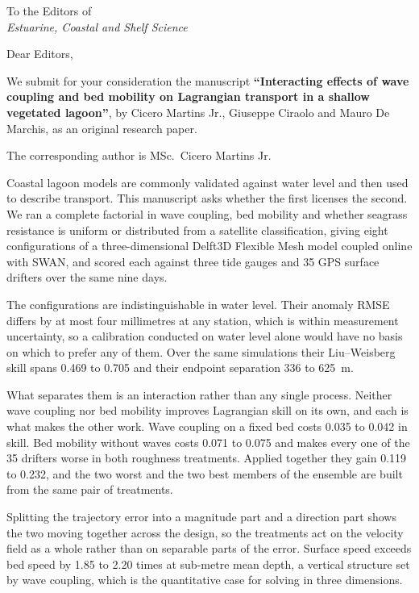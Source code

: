 \documentclass[11pt]{article}
\begin{document}
\thispagestyle{fancy}

\vspace{0.3cm}
\begin{flushright}
To the Editors of\\
\textit{Estuarine, Coastal and Shelf Science}
\end{flushright}

\vspace{0.5cm}
Dear Editors,

\vspace{0.2cm}
We submit for your consideration the manuscript \textbf{``Interacting effects of
wave coupling and bed mobility on Lagrangian transport in a shallow vegetated
lagoon''}, by Cicero Martins Jr., Giuseppe Ciraolo and Mauro De Marchis, as an
original research paper.

The corresponding author is MSc.\ Cicero Martins Jr.

\vspace{0.3cm}
Coastal lagoon models are commonly validated against water level and then used
to describe transport. This manuscript asks whether the first licenses the
second. We ran a complete factorial in wave coupling, bed mobility and whether
seagrass resistance is uniform or distributed from a satellite classification,
giving eight configurations of a three-dimensional Delft3D Flexible Mesh model
coupled online with SWAN, and scored each against three tide gauges and 35 GPS
surface drifters over the same nine days.

The configurations are indistinguishable in water level. Their anomaly RMSE
differs by at most four millimetres at any station, which is within measurement
uncertainty, so a calibration conducted on water level alone would have no basis
on which to prefer any of them. Over the same simulations their Liu--Weisberg
skill spans 0.469 to 0.705 and their endpoint separation 336 to 625~m.

What separates them is an interaction rather than any single process. Neither
wave coupling nor bed mobility improves Lagrangian skill on its own, and each is
what makes the other work. Wave coupling on a fixed bed costs 0.035 to 0.042 in
skill. Bed mobility without waves costs 0.071 to 0.075 and makes every one of
the 35 drifters worse in both roughness treatments. Applied together they gain
0.119 to 0.232, and the two worst and the two best members of the ensemble are
built from the same pair of treatments.

Splitting the trajectory error into a magnitude part and a direction part shows
the two moving together across the design, so the treatments act on the velocity
field as a whole rather than on separable parts of the error. Surface speed
exceeds bed speed by 1.85 to 2.20 times at sub-metre mean depth, a vertical
structure set by wave coupling, which is the quantitative case for solving in
three dimensions.
\end{document}

